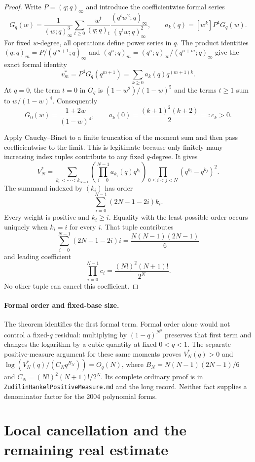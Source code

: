 \documentclass[11pt]{article}
\begin{document}
\begin{proof}
Write $P=(q;q)_\infty$ and introduce the coefficientwise formal series
\[
 G_q(w)=\frac1{(w;q)_\infty^3}
 \sum_{t\ge0}\frac{w^t}{(q;q)_t}
       \frac{(q^tw^2;q)_\infty}{(q^tw;q)_\infty^2},
 \qquad a_k(q)=[w^k]P^4G_q(w).
\]
For fixed $w$-degree, all operations define power series in $q$.
The product identities
$(q;q)_m=P/(q^{m+1};q)_\infty$ and
$(q^a;q)_m=(q^a;q)_\infty/(q^{a+m};q)_\infty$
give the exact formal identity
\[
 v_m^*=P^4G_q(q^{m+1})
      =\sum_{k\ge0}a_k(q)q^{(m+1)k}.
\]
At $q=0$, the term $t=0$ in $G_q$ is
$(1-w^2)/(1-w)^5$ and the terms $t\ge1$ sum to $w/(1-w)^4$.
Consequently
\[
 G_0(w)=\frac{1+2w}{(1-w)^4},\qquad
 a_k(0)=\frac{(k+1)^2(k+2)}2=:c_k>0.
\]

Apply Cauchy--Binet to a finite truncation of the moment sum and then pass
coefficientwise to the limit.  This is legitimate because only finitely many
increasing index tuples contribute to any fixed $q$-degree.  It gives
\[
 V_N^*=\sum_{k_0<\cdots<k_{N-1}}
 \left(\prod_{i=0}^{N-1}a_{k_i}(q)q^{k_i}\right)
 \prod_{0\le i<j<N}(q^{k_i}-q^{k_j})^2.
\]
The summand indexed by $(k_i)$ has order
\[
 \sum_{i=0}^{N-1}(2N-1-2i)k_i.
\]
Every weight is positive and $k_i\ge i$.  Equality with the least possible
order occurs uniquely when $k_i=i$ for every $i$.  That tuple contributes
\[
 \sum_{i=0}^{N-1}(2N-1-2i)i=\frac{N(N-1)(2N-1)}6
\]
and leading coefficient
\[
 \prod_{i=0}^{N-1}c_i=\frac{(N!)^2(N+1)!}{2^N}.
\]
No other tuple can cancel this coefficient.
\end{proof}

\paragraph{Formal order and fixed-base size.}
The theorem identifies the first formal term.  Formal order alone would not
control a fixed-$q$ residual: multiplying by $(1-q)^{N^3}$ preserves that first
term and changes the logarithm by a cubic quantity at fixed $0<q<1$.
The separate positive-measure argument for these same moments proves
$V_N^*(q)>0$ and
$\log(V_N^*(q)/(C_Nq^{B_N}))=O_q(N)$, where
$B_N=N(N-1)(2N-1)/6$ and $C_N=(N!)^2(N+1)!/2^N$.
Its complete ordinary proof is in
\texttt{ZudilinHankelPositiveMeasure.md} and the long record.
Neither fact supplies a denominator factor for the 2004 polynomial forms.



\section{Local cancellation and the remaining real estimate}
\label{sec:open}
\end{document}
